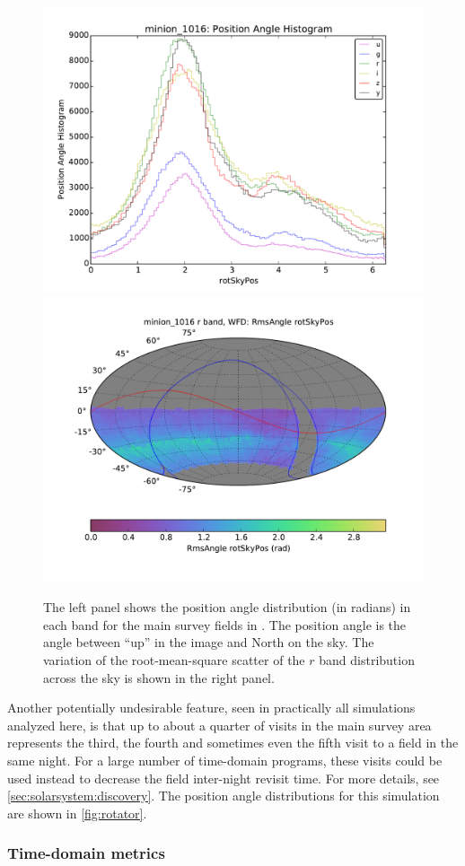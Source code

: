 \begin{figure}[th!]
\vskip -0.0in
\includegraphics[angle=0,width=0.49\hsize,clip]{figs/cadence/minion_1016_Position_Angle_Histogram_u_g_r_i_z_y_band_WFD_ONED_ComboBinnedData.pdf}
\includegraphics[angle=0,width=0.49\hsize,clip]{figs/cadence/minion_1016_RmsAngle_rotSkyPos_r_band_WFD_OPSI_SkyMap.pdf}
\vskip -0.1in
\caption{The left panel shows the position angle distribution (in radians)  in each band for the
main survey fields in . The position angle is the angle between
``up'' in the image and North on the sky. The variation of the root-mean-square scatter of the
$r$ band distribution across the sky is shown in the right panel.}
\label{fig:rotator}
\end{figure}

Another potentially undesirable feature, seen in practically all
simulations analyzed here, is that up to about a quarter of visits in
the main survey area represents the third, the fourth and sometimes
even the fifth visit to a field in the same night. For a large number
of time-domain programs, these visits could be used instead to
decrease the field inter-night revisit time. For more details, see
\autoref{sec:solarsystem:discovery}. The position angle distributions for this simulation
are shown in \autoref{fig:rotator}.


\subsubsection{Time-domain metrics}

